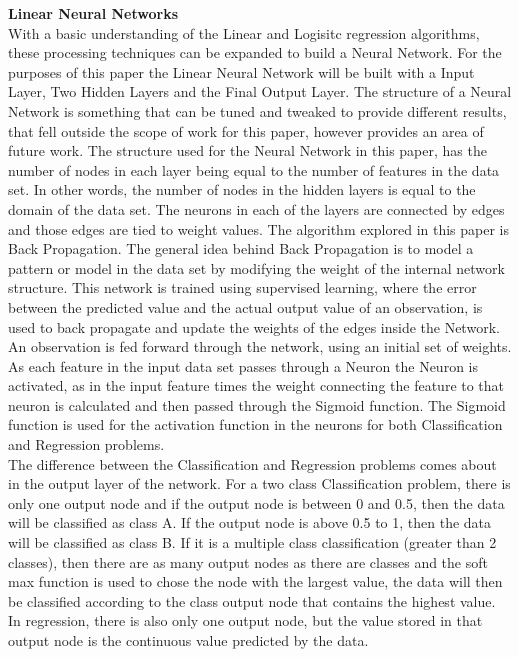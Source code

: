 \documentclass[twoside,11pt]{article}
\begin{document}
\hspace*{10mm} \textbf{Linear Neural Networks}\\
\hspace*{10mm} With a basic understanding of the Linear and Logisitc regression algorithms, these processing techniques can be expanded to build a Neural Network. For the purposes of this paper the Linear Neural Network will be built with a Input Layer, Two Hidden Layers and the Final Output Layer. The structure of a Neural Network is something that can be tuned and tweaked to provide different results, that fell outside the scope of work for this paper, however provides an area of future work. The structure used for the Neural Network in this paper, has the number of nodes in each layer being equal to the number of features in the data set. In other words, the number of nodes in the hidden layers is equal to the domain of the data set. The neurons in each of the layers are connected by edges and those edges are tied to weight values. The algorithm explored in this paper is Back Propagation. The general idea behind Back Propagation is to model a pattern or model in the data set by modifying the weight of the internal network structure. This network is trained using supervised learning, where the error between the predicted value and the actual output value of an observation, is used to back propagate and update the weights of the edges inside the Network.\\
\hspace*{10mm} An observation is fed forward through the network, using an initial set of weights. As each feature in the input data set passes through a Neuron the Neuron is activated, as in the input feature times the weight connecting the feature to that neuron is calculated and then passed through the Sigmoid function. The Sigmoid function is used for the activation function in the neurons for both Classification and Regression problems.\\
\hspace*{10mm} The difference between the Classification and Regression problems comes about in the output layer of the network. For a two class Classification problem, there is only one output node and if the output node is between 0 and 0.5, then the data will be classified as class A. If the output node is above 0.5 to 1, then the data will be classified as class B. If it is a multiple class classification (greater than 2 classes), then there are as many output nodes as there are classes and the soft max function is used to chose the node with the largest value, the data will then be classified according to the class output node that contains the highest value.  In regression, there is also only one output node, but the value stored in that output node is the continuous value predicted by the data.\\ 
\end{document}

